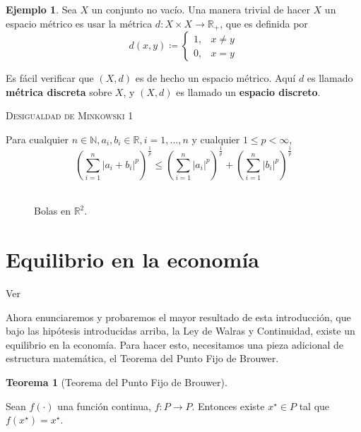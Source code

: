 \documentclass[10pt,a4paper]{article}
\theoremstyle{definition}
\newtheorem{theorem}{Teorema}[section]
\newtheorem{example}{Ejemplo}
\newcommand{\brouwer}{Teorema del Punto Fijo de Brouwer}
\newcommand{\walras}{Ley de Walras y Continuidad}
\begin{document}
\begin{example}

Sea $X$ un conjunto no vacío. Una manera trivial de hacer $X$ un espacio métrico es usar la métrica $d:X\times X\rightarrow\mathbb{R}_+$, que es definida por
$$
d(x,y)\coloneqq\begin{cases}
1,&x\neq y\\
0,& x=y
\end{cases}
$$

Es fácil verificar que $(X,d)$ es de hecho un espacio métrico. Aquí $d$ es llamado \textbf{métrica discreta} sobre $X$, y $(X,d)$ es llamado un \textbf{espacio discreto}.
\end{example}

\clearpage
\setcounter{page}{2}
\begin{mdframed}[style=minkowski]
	\vspace*{3mm}
	\color{Violet}
	\textsc{Desigualdad de Minkowski 1}
	
	\noindent
	Para cualquier $n\in\mathbb{N}, a_i, b_i\in\mathbb{R}, i=1,\ldots,n$ y cualquier $1\leq p<\infty$,
	\
	$$
	{\left(\sum_{i=1}^{n}{\left\lvert a_i+b_i\right\rvert}^{p}\right)}^{\frac{1}{p}}\leq
	{\left(\sum_{i=1}^{n}{\left\lvert a_i\right\rvert}^{p}\right)}^{\frac{1}{p}}+
	{\left(\sum_{i=1}^{n}{\left\lvert b_i\right\rvert}^{p}\right)}^{\frac{1}{p}}
	$$
	\
\end{mdframed}

\begin{figure}[H]
	\centering
	\scalebox{.5}{}
	\caption{Bolas en $\mathbb{R}^2$.}
\end{figure}

\section[Equilibrio]{Equilibrio en la economía}

Ver \cite[Capítulo 5]{Starr2011}

{
\sffamily\LARGE
Ahora enunciaremos y probaremos el mayor resultado de esta introducción, que bajo las hipótesis introducidas arriba, la \walras, existe un equilibrio en la economía. Para hacer esto, necesitamos una pieza adicional de estructura matemática, el \brouwer.
}

\begin{theorem}[\brouwer]\label{eq:brouwer}

Sean $f(\cdot)$ una función continua, $f:P\rightarrow P$. Entonces existe $x^{\star}\in P$ tal que $f(x^{\star})=x^{\star}$.

\end{theorem}
\end{document}
